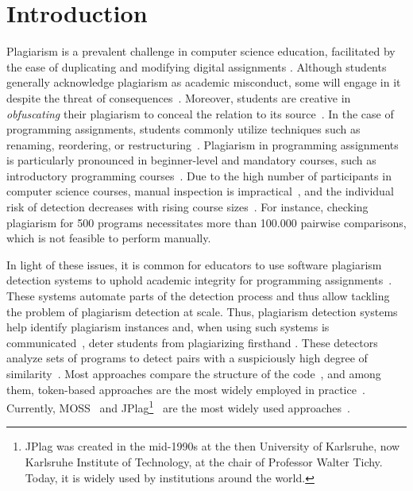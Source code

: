 \chapter{Introduction}

Plagiarism is a prevalent challenge in computer science education, facilitated by the ease of duplicating and modifying digital assignments \cite{Cosma2008, Murray2010, Le2013}.
Although students generally acknowledge plagiarism as academic misconduct, some will engage in it despite the threat of consequences~\cite{Sutton2014}.
Moreover, students are creative in \textit{obfuscating} their plagiarism to conceal the relation to its source~\cite{Pawelczak2018}. In the case of programming assignments, students commonly utilize techniques such as renaming, reordering, or restructuring~\cite{Novak2019, Karnalim2016, Saglam2023}.
Plagiarism in programming assignments is particularly pronounced in beginner-level and mandatory courses, such as introductory programming courses~\cite{Park2003}.
Due to the high number of participants in computer science courses, manual inspection is impractical~\cite{Camp2017, Kustanto2009}, and the individual risk of detection decreases with rising course sizes~\cite{Yan2018}.
For instance, checking plagiarism for 500 programs necessitates more than 100.000 pairwise comparisons, which is not feasible to perform manually.

In light of these issues, it is common for educators to use software plagiarism detection systems to uphold academic integrity for programming assignments~\cite{DevoreMcDonald2020}. These systems automate parts of the detection process and thus allow tackling the problem of plagiarism detection at scale.
Thus, plagiarism detection systems help identify plagiarism instances and, when using such systems is communicated~\cite{Karnalim2022}, deter students from plagiarizing firsthand \cite{Braumoeller2001}.
These detectors analyze sets of programs to detect pairs with a suspiciously high degree of similarity~\cite{prechelt2000}.
Most approaches compare the structure of the code~\cite{Nichols2019, Novak2019}, and among them, token-based approaches are the most widely employed in practice~\cite{Novak2019}. Currently, MOSS~\cite{MOSS} and JPlag\footnote{JPlag was created in the mid-1990s at the then University of Karlsruhe, now Karlsruhe Institute of Technology, at the chair of Professor Walter Tichy. Today, it is widely used by institutions around the world.}~\cite{prechelt2000, prechelt2002} are the most widely used approaches~\cite{Aniceto2021, Novak2019, Lancaster2004}.

